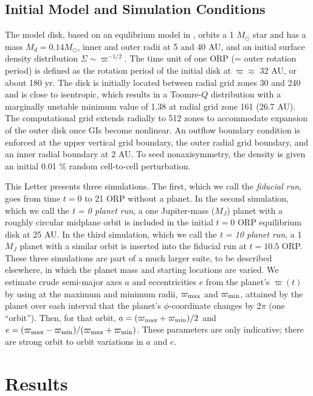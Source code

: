 \documentclass[12pt,manuscript,authoryear]{aastex}
\begin{document}
\subsection{Initial Model and Simulation Conditions}

The model disk, based on an equlibrium model in \citet{pickett2003}, orbits a 1 $M_{\odot}$ star and has a mass $M_d = 0.14 M_{\odot}$, inner and outer radii at 5 and 40 AU, and an initial surface density distribution $\Sigma \sim \varpi^{-1/2}$. The time unit of one ORP (= outer rotation period) is defined as the rotation period of the initial disk at $\varpi \approx$ 32 AU, or about 180 yr. The disk is initially located between radial grid zones 30 and 240 and is close to isentropic, which results in a Toomre-$Q$ distribution with a marginally unstable \citep[see ][]{durisen2007} minimum value of 1.38 at radial grid zone 161 (26.7 AU). The computational grid extends radially to 512 zones to accommodate expansion of the outer disk once GIs become nonlinear. An outflow boundary condition is enforced at the upper vertical grid boundary, the outer radial grid boundary, and an inner radial boundary at 2 AU. To seed nonaxisymmetry, the density is given an initial 0.01 \% random cell-to-cell perturbation.

This Letter presents three simulations. The first, which we call the {\sl fiducial run}, goes from time $t = 0$ to 21 ORP without a planet. In the second simulation, which we call the {\sl t = 0 planet run}, a one Jupiter-mass ($M_J$) planet with a roughly circular midplane orbit is included in the initial $t = 0$ ORP equilibrium disk at 25 AU. In the third simulation, which we call the {\sl t = 10 planet run}, a 1 $M_J$ planet with a similar orbit is inserted into the fiducial run at $t = 10.5$ ORP. These three simulations are part of a much larger suite, to be described elsewhere, in which the planet mass and starting locations are varied. We estimate crude semi-major axes $a$ and eccentricities $e$ from the planet's $\varpi(t)$ by using at the maximum and minimum radii, $\varpi_{\rm max}$ and $\varpi_{\rm min}$, attained by the planet over each interval that the planet's $\phi$-coordinate changes by 2$\pi$ (one ``orbit'').  Then, for that orbit, $a = (\varpi_{\rm max}+\varpi_{\rm min})/2$ and $e = (\varpi_{\rm max}-\varpi_{\rm min})/(\varpi_{\rm max}+\varpi_{\rm min})$. These parameters are only indicative; there are strong orbit to orbit variations in $a$ and $e$.

\section{Results}
\end{document}
